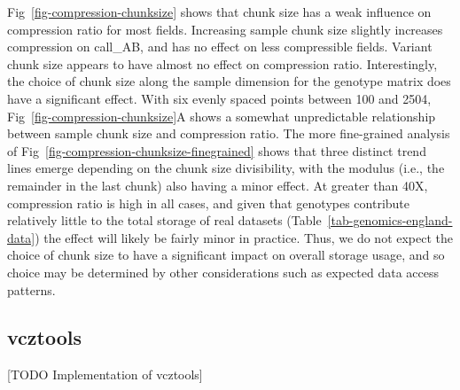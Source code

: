 \documentclass[a4paper,num-refs]{oup-contemporary}
\begin{document}
Fig~\ref{fig-compression-chunksize} shows that chunk size has a 
weak influence on compression ratio for most fields. 
Increasing sample chunk size slightly increases 
compression on call\_AB, and has no effect on less compressible
fields. Variant chunk size appears to have almost no effect 
on compression ratio. 
Interestingly, the choice of chunk size along the sample dimension for the
genotype matrix does have a significant effect. 
With six evenly spaced points between 100 and 2504,
Fig~\ref{fig-compression-chunksize}A shows a somewhat unpredictable 
relationship between sample chunk size and compression ratio.
The more fine-grained analysis of
Fig~\ref{fig-compression-chunksize-finegrained} shows that three
distinct trend lines emerge depending on the chunk size 
divisibility, with the modulus 
(i.e., the remainder in the last chunk) also having a minor effect. 
At greater than 40X,
compression ratio is 
high in all cases, and given that genotypes contribute relatively
little to the total storage of real datasets
(Table~\ref{tab-genomics-england-data}) the effect will
likely be fairly minor in practice.
Thus, we do not expect the choice of chunk size to have a significant
impact on overall storage usage, and so choice may be
determined by other considerations such as expected data
access patterns.

\subsection{vcztools}
[TODO Implementation of vcztools]
\end{document}
